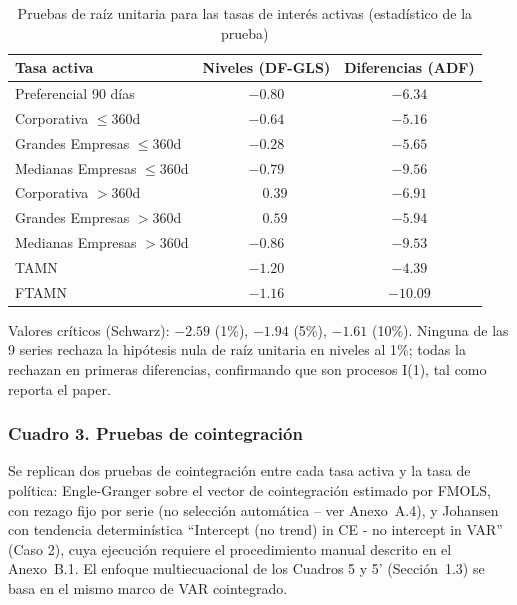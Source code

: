 \documentclass[12pt, letterpaper]{article}
\begin{document}
\begin{table}[ht]
\renewcommand{\thetable}{2}
\begin{threeparttable}
\caption{Pruebas de raíz unitaria para las tasas de interés activas
         (estadístico de la prueba)}
\label{tab:cuadro2}
\small
\begin{tabular}{lcc}
\toprule
Tasa activa & Niveles (DF-GLS) & Diferencias (ADF) \\
\midrule
Preferencial 90 días        & $-0.80$ & $-6.34$ \\
Corporativa $\le$360d       & $-0.64$ & $-5.16$ \\
Grandes Empresas $\le$360d  & $-0.28$ & $-5.65$ \\
Medianas Empresas $\le$360d & $-0.79$ & $-9.56$ \\
Corporativa $>$360d         & $\phantom{-}0.39$ & $-6.91$ \\
Grandes Empresas $>$360d    & $\phantom{-}0.59$ & $-5.94$ \\
Medianas Empresas $>$360d   & $-0.86$ & $-9.53$ \\
TAMN                        & $-1.20$ & $-4.39$ \\
FTAMN                       & $-1.16$ & $-10.09$ \\
\bottomrule
\end{tabular}
\begin{tablenotes}[flushleft]
\footnotesize\item
Valores críticos (Schwarz): $-2.59$ (1\%), $-1.94$ (5\%), $-1.61$
(10\%). Ninguna de las 9 series rechaza la hipótesis nula de raíz
unitaria en niveles al 1\%; todas la rechazan en primeras diferencias,
confirmando que son procesos I(1), tal como reporta el paper.
\end{tablenotes}
\end{threeparttable}
\end{table}

\subsubsection{Cuadro 3. Pruebas de cointegración}

Se replican dos pruebas de cointegración entre cada tasa activa y la
tasa de política: Engle-Granger \parencite{engle1987} sobre el vector
de cointegración estimado por FMOLS, con rezago fijo por serie (no
selección automática -- ver Anexo~A.4), y Johansen
\parencite{johansen1988,johansen1991}
con tendencia determinística ``Intercept (no trend) in CE - no
intercept in VAR'' (Caso 2), cuya ejecución requiere el procedimiento
manual descrito en el Anexo~B.1. El enfoque multiecuacional de los
Cuadros 5 y 5' (Sección~1.3) se basa en el mismo marco de VAR
cointegrado.
\end{document}
